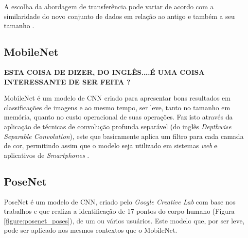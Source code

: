 \par A escolha da abordagem de transferência pode variar de acordo com a similaridade do novo conjunto de dados em relação ao antigo e também a seu tamanho \cite{Carneiro2017}.


\subsection{MobileNet}

\textbf{ESTA COISA DE DIZER, DO INGLÊS....É UMA COISA INTERESSANTE DE SER FEITA ?}

\par MobileNet é um modelo de CNN criado para apresentar bons resultados em classificações de imagens e ao mesmo tempo, ser leve, tanto no tamanho em memória, quanto no custo operacional de suas operações. Faz isto através da aplicação de técnicas de convolução profunda separável (do inglês \textit{Depthwise Separable Convolution}), este que basicamente aplica um filtro para cada camada de cor, permitindo assim que o modelo seja utilizado em sistemas \textit{web} e aplicativos de \textit{Smartphones} \cite{howard2017mobilenets}.

\subsection{PoseNet}

\par PoseNet é um modelo de CNN, criado pelo \textit{Google Creative Lab} com base nos trabalhos \cite{george2017} e \cite{george2018} que realiza a identificação de 17 pontos do corpo humano (Figura \ref{figure:posenet_poses}), de um ou vários usuários. Este modelo que, por ser leve, pode ser aplicado nos mesmos contextos que o MobileNet.


